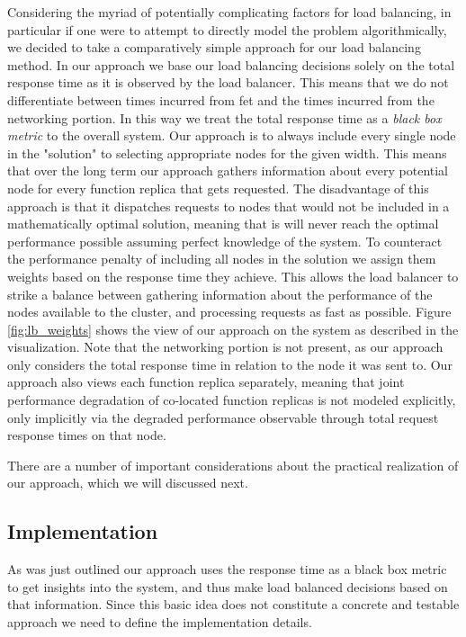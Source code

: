 Considering the myriad of potentially complicating factors for load balancing, in particular if one were to attempt to directly model the problem algorithmically, we decided to take a comparatively simple approach for our load balancing method.
In our approach we base our load balancing decisions solely on the total response time as it is observed by the load balancer. This means that we do not differentiate between times incurred from \gls{fet} and the times incurred from the networking portion. In this way we treat the total response time as a \textit{black box metric} to the overall system.
Our approach is to always include every single node in the "solution" to selecting appropriate nodes for the given width. This means that over the long term our approach gathers information about every potential node for every function replica that gets requested.
The disadvantage of this approach is that it dispatches requests to nodes that would not be included in a mathematically optimal solution, meaning that is will never reach the optimal performance possible assuming perfect knowledge of the system.
To counteract the performance penalty of including all nodes in the solution we assign them weights based on the response time they achieve.
This allows the load balancer to strike a balance between gathering information about the performance of the nodes available to the cluster, and processing requests as fast as possible.
Figure \ref{fig:lb_weights} shows the view of our approach on the system as described in the visualization. Note that the networking portion is not present, as our approach only considers the total response time in relation to the node it was sent to. Our approach also views each function replica separately, meaning that joint performance degradation of co-located function replicas is not modeled explicitly, only implicitly via the degraded performance observable through total request response times on that node.

There are a number of important considerations about the practical realization of our approach, which we will discussed next.


\subsection{Implementation}
As was just outlined our approach uses the response time as a black box metric to get insights into the system, and thus make load balanced decisions based on that information.
Since this basic idea does not constitute a concrete and testable approach we need to define the implementation details.

